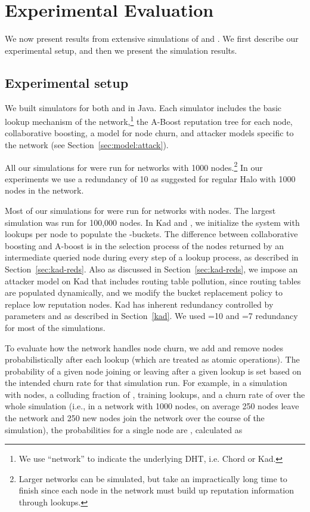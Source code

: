 

\section{Experimental Evaluation}
\label{sec:eval}

We now present results from extensive simulations of \hsys and \ksys. We
first describe our experimental setup, and then we present the simulation
results.
\subsection{Experimental setup}
\label{sec:setup}
We built simulators for both \hsys and \ksys in Java. Each simulator
includes the basic lookup mechanism of the network,\footnote{We use  ``network'' to indicate the underlying DHT,
  i.e. Chord or Kad.} the A-Boost reputation tree for each node,
collaborative boosting, a model for node churn, and attacker models
specific to the network (see Section~\ref{sec:model:attack}).




All our simulations for \hsys were run for networks with 1000
nodes.\footnote{Larger networks can be simulated, but take an
  impractically long time to finish since each node in the network must
  build up reputation information through lookups.} In our experiments
we use a redundancy of 10 as suggested for regular Halo with 1000 nodes
in the network. 


Most of our simulations for \ksys were run for networks with 
nodes. The largest simulation was run for 100,000 nodes. In Kad and
\ksys, we initialize the system with  lookups per node to populate
the -buckets. The difference between collaborative boosting and
A-boost is in the selection process of the  nodes returned by an
intermediate queried node during every step of a lookup process, as
described in Section~\ref{sec:kad-reds}.
Also as discussed in Section~\ref{sec:kad-reds}, we impose an attacker
model on Kad that includes routing table pollution, since routing tables
are populated dynamically, and we modify the bucket replacement policy
to replace low reputation nodes.
Kad has inherent redundancy controlled by
parameters  and  as described in Section~\ref{kad}. We
used =10 and =7 redundancy for most of the simulations.


 To evaluate how the network handles node churn, we
add and remove nodes probabilistically after each lookup (which are
treated as atomic operations). The probability of a given node joining
or leaving after a given lookup is set based on the intended churn rate
for that simulation run. For example, in a simulation with 
nodes, a colluding fraction of ,  training lookups, and
a churn rate of  over the whole simulation (i.e., in a network
with 1000 nodes, on average 250 nodes leave the network and 250 new
nodes join the network over the course of the simulation),  the
probabilities for a single node are ,
calculated as

